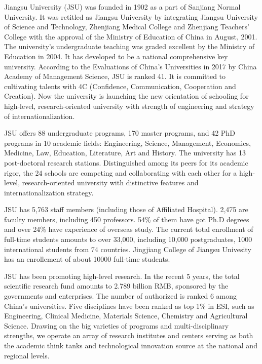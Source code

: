 \begin{englishabstract}

Jiangsu University (JSU) was founded in 1902 as a part of Sanjiang Normal University. It was retitled as Jiangsu University by integrating Jiangsu University of Science and Technology, Zhenjiang Medical College and Zhenjiang Teachers’ College with the approval of the Ministry of Education of China in August, 2001. The university’s undergraduate teaching was graded excellent by the Ministry of Education in 2004. It has developed to be a national comprehensive key university. According to the Evaluations of China’s Universities in 2017 by China Academy of Management Science, JSU is ranked 41. It is committed to cultivating talents with 4C (Confidence, Communication, Cooperation and Creation). Now the university is launching the new orientation of schooling for high-level, research-oriented university with strength of engineering and strategy of internationalization.
 
JSU offers 88 undergraduate programs, 170 master programs, and 42 PhD programs in 10 academic fields: Engineering, Science, Management, Economics, Medicine, Law, Education, Literature, Art and History. The university has 13 post-doctoral research stations. Distinguished among its peers for its academic rigor, the 24 schools are competing and collaborating with each other for a high-level, research-oriented university with distinctive features and internationalization strategy.

JSU has 5,763 staff members (including those of Affiliated Hospital). 2,475 are faculty members, including 450 professors. 54\% of them have got Ph.D degrees and over 24\% have experience of overseas study. The current total enrollment of full-time students amounts to over 33,000, including 10,000 postgraduates, 1000 international students from 74 countries. Jingjiang College of Jiangsu Univesity has an enrollement of about 10000 full-time students.

JSU has been promoting high-level research. In the recent 5 years, the total scientific research fund amounts to 2.789 billion RMB, sponsored by the governments and enterprises. The number of authorized is ranked 6 among China’s universities. Five disciplines have been ranked as top 1\% in ESI, such as Engineering, Clinical Medicine, Materials Science, Chemistry and Agricultural Science. Drawing on the big varieties of programs and multi-disciplinary strengths, we operate an array of research institutes and centers serving as both the academic think tanks and technological innovation source at the national and regional levels. 


\end{englishabstract}
